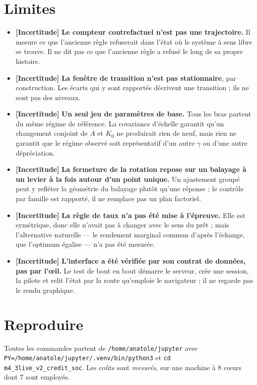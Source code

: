 \documentclass[11pt,a4paper]{article}
\newcommand{\code}[1]{\texttt{#1}}
\newcommand{\incertitude}{\textbf{[Incertitude]}}
\begin{document}
\section{Limites}
\label{sec:limites}

\begin{itemize}
\item \incertitude{} \textbf{Le compteur contrefactuel n'est pas une
  trajectoire.} Il mesure ce que l'ancienne règle refuserait dans l'état où le
  système à sens libre se trouve. Il ne dit pas ce que l'ancienne règle a
  refusé le long de sa propre histoire.
\item \incertitude{} \textbf{La fenêtre de transition n'est pas stationnaire},
  par construction. Les écarts qui y sont rapportés décrivent une transition ;
  ils ne sont pas des niveaux.
\item \incertitude{} \textbf{Un seul jeu de paramètres de base.} Tous les bras
  partent du même régime de référence. La covariance d'échelle garantit qu'un
  changement conjoint de $A$ et $K_0$ ne produirait rien de neuf, mais rien ne
  garantit que le régime observé soit représentatif d'un autre $\gamma$ ou
  d'une autre dépréciation.
\item \incertitude{} \textbf{La fermeture de la rotation repose sur un
  balayage à un levier à la fois autour d'un point unique.} Un ajustement
  groupé peut y refléter la géométrie du balayage plutôt qu'une réponse ; le
  contrôle par famille est rapporté, il ne remplace pas un plan factoriel.
\item \incertitude{} \textbf{La règle de taux n'a pas été mise à l'épreuve.}
  Elle est symétrique, donc elle n'avait pas à changer avec le sens du prêt ;
  mais l'alternative naturelle --- le rendement marginal commun d'après
  l'échange, que l'optimum égalise --- n'a pas été mesurée.
\item \incertitude{} \textbf{L'interface a été vérifiée par son contrat de
  données, pas par l'œil.} Le test de bout en bout démarre le serveur, crée une
  session, la pilote et relit l'état par la route qu'emploie le navigateur ; il
  ne regarde pas le rendu graphique.
\end{itemize}

\section{Reproduire}
\label{sec:reproduire}

Toutes les commandes partent de \code{/home/anatole/jupyter} avec
\code{PY=/home/anatole/jupyter/.venv/bin/python3} et
\code{cd m4\_3live\_v2\_credit\_soc}. Les coûts sont \emph{mesurés}, sur une
machine à 8 cœurs dont 7 sont employés.
\end{document}
